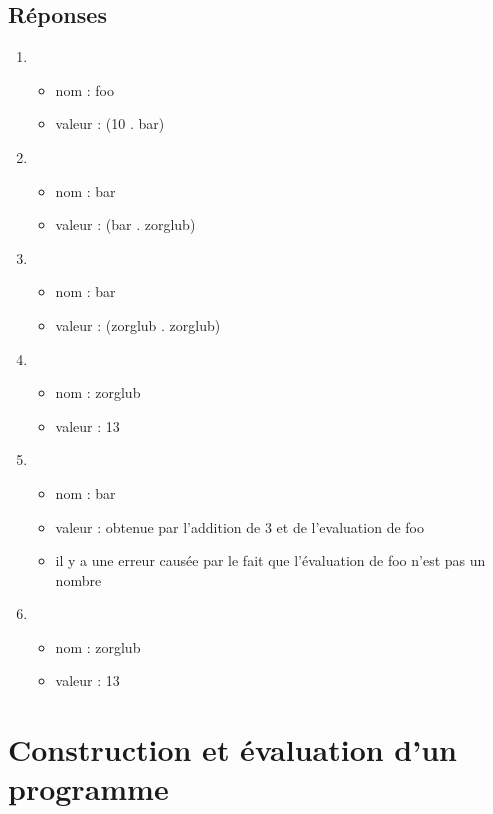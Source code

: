 \documentclass[a4paper, 11pt]{article}
\begin{document}
\subsection{Réponses}
\begin{enumerate}
    \item \begin{itemize}
            \item nom : foo
            \item valeur : (10 . bar)
          \end{itemize}
    \item \begin{itemize}
            \item nom : bar
            \item valeur : (bar . zorglub)
          \end{itemize}
    \item \begin{itemize}
            \item nom : bar
            \item valeur : (zorglub . zorglub)
          \end{itemize}
    \item \begin{itemize}
            \item nom : zorglub
            \item valeur : 13
          \end{itemize}
    \item \begin{itemize}
            \item nom : bar
            \item valeur : obtenue par l'addition de 3 et de l'evaluation de foo
            \item il y a une erreur causée par le fait que l'évaluation de foo n'est pas un nombre
          \end{itemize}
    \item \begin{itemize}
            \item nom : zorglub
            \item valeur : 13
          \end{itemize}
\end{enumerate}

\section{Construction et évaluation d'un programme}
\end{document}
